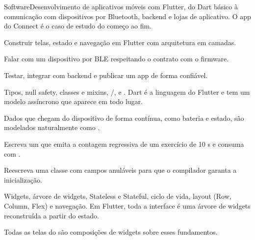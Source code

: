 \begin{parte}{Software}{Desenvolvimento de aplicativos móveis com Flutter, do Dart básico à comunicação com dispositivos por Bluetooth, backend e lojas de aplicativo. O app do Connect é o caso de estudo do começo ao fim.}
  \item Construir telas, estado e navegação em Flutter com arquitetura em camadas.
  \item Falar com um dispositivo por BLE respeitando o contrato com o firmware.
  \item Testar, integrar com backend e publicar um app de forma confiável.
\end{parte}


Tipos, null safety, classes e mixins, /,  e . Dart é a linguagem do Flutter e tem um modelo assíncrono que aparece em todo lugar.

\begin{noproduto}
Dados que chegam do dispositivo de forma contínua, como bateria e estado, são modelados naturalmente como .
\end{noproduto}

\begin{paraestudar}
  \item {}
  \item {}
  \item {}
\end{paraestudar}

\begin{pratique}
  \item Escreva um  que emita a contagem regressiva de um exercício de 10 s e consuma com .
  \item Reescreva uma classe com campos anuláveis para que o compilador garanta a inicialização.
\end{pratique}

Widgets, árvore de widgets, Stateless e Stateful, ciclo de vida, layout (Row, Column, Flex) e navegação. Em Flutter, toda a interface é uma árvore de widgets reconstruída a partir do estado.

\begin{noproduto}
Todas as telas do  são composições de widgets sobre esses fundamentos.
\end{noproduto}

